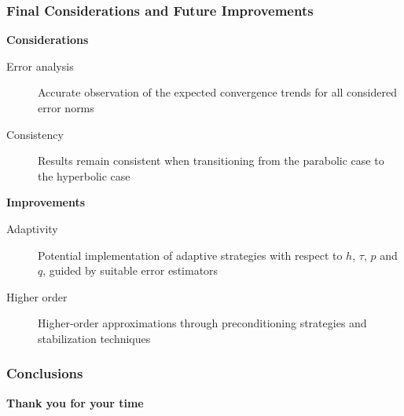 \begin{frame}
    \frametitle{Final Considerations and Future Improvements}

    \vspace*{\fill}
    \begin{multicols}{2}

        \begin{center}
            {\color{\accentcolor} \Large \textbf{Considerations}}
            \vspace*{0.5cm}

            \begin{minipage}{0.4\textwidth}
                \begin{description}
                    \item[Error analysis] Accurate observation of the expected convergence trends for all considered error norms
                    \item[Consistency] Results remain consistent when transitioning from the parabolic case to the hyperbolic case
                \end{description}
            \end{minipage}
        \end{center}

        \vfill\null
        \columnbreak

        \begin{center}
            {\color{\accentcolor} \Large \textbf{Improvements}}
            \vspace*{0.5cm}

            \begin{minipage}{0.4\textwidth}
                \begin{description}
                    \item[Adaptivity] Potential implementation of adaptive strategies with respect to $h$, $\tau$, $p$ and $q$, guided by suitable error estimators
                    \item[Higher order] Higher-order approximations through preconditioning strategies and stabilization techniques
                \end{description}
            \end{minipage}
        \end{center}
    \end{multicols}
    \vspace*{\fill}
    
\end{frame}

\begin{frame}
    \frametitle{Conclusions}

    \vspace*{\fill}
    \begin{center}
        \Huge{\textbf{Thank you for your time}}
    \end{center}
    \vspace*{\fill}
    
\end{frame}